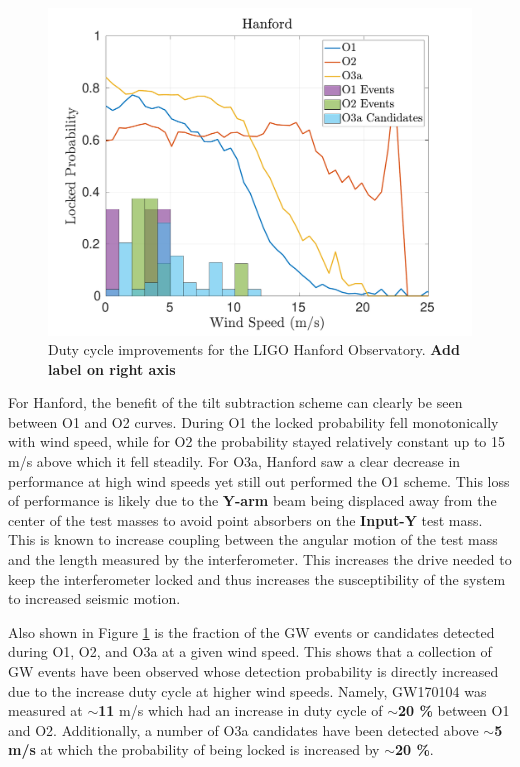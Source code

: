 \documentclass [12pt, proquest]{uwthesis}[2019]
\begin{document}
\begin{figure}%
\begin{center}
\includegraphics[width=\textwidth]{LHO_WindVsLockEvents.pdf}
\caption{Duty cycle improvements for the LIGO Hanford Observatory. \textbf{Add label on right axis}}
\label{LHO_events}
\end{center}
\end{figure}

For Hanford, the benefit of the tilt subtraction scheme can clearly be seen between O1 and O2 curves. During O1 the locked probability fell monotonically with wind speed, while for O2 the probability stayed relatively constant up to 15 m/s above which it fell steadily. For O3a, Hanford saw a clear decrease in performance at high wind speeds yet still out performed the O1 scheme. This loss of performance is likely due to the \textbf{Y-arm} beam being displaced away from the center of the test masses to avoid point absorbers on the \textbf{Input-Y} test mass. This is known to increase coupling between the angular motion of the test mass and the length measured by the interferometer. This increases the drive needed to keep the interferometer locked and thus increases the susceptibility of the system to increased seismic motion. 

Also shown in Figure \ref{LHO_events} is the fraction of the GW events or candidates detected during O1, O2, and O3a at a given wind speed. This shows that a collection of GW events have been observed whose detection probability is directly increased due to the increase duty cycle at higher wind speeds. Namely, GW170104 was measured at $\sim$\textbf{11} m/s which had an increase in duty cycle of $\sim$\textbf{20 \%} between O1 and O2. Additionally, a number of O3a candidates have been detected above $\sim$\textbf{5 m/s} at which the probability of being locked is increased by $\sim$\textbf{20 \%}.
\end{document}
